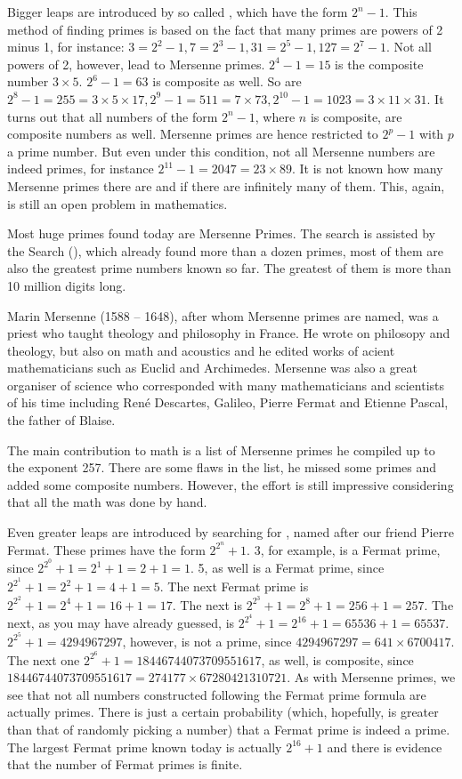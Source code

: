 \documentclass{scrreprt}
\begin{document}
Bigger leaps are introduced by so called ,
which have the form $2^n - 1$.
This method of finding primes is based on the fact
that many primes are powers of 2 minus 1, for instance:
$3 = 2^2 - 1, 7 = 2^3 - 1, 31 = 2^5 - 1, 127 = 2^7 - 1$.
Not all powers of 2, however, lead to Mersenne primes.
$2^4 - 1 =  15$ is the composite number $3 \times 5$.
$2^6 - 1 =  63$ is composite as well. So are
$2^8 - 1 =  255 = 3 \times 5 \times 17, 
 2^9 - 1 =  511 = 7 \times 73,
 2^{10} -1 = 1023 = 3 \times 11 \times 31$.  
It turns out that all numbers of the form $2^n - 1$, 
where $n$ is composite, are composite numbers as well.
Mersenne primes are hence restricted to
$2^p - 1$ with $p$ a prime number.
But even under this condition, not all Mersenne numbers
are indeed primes, for instance
$2^{11} - 1 = 2047 = 23 \times 89$.
It is not known how many Mersenne primes there are
and if there are infinitely many of them.
This, again, is still an open problem in mathematics.

Most huge primes found today are Mersenne Primes.
The search is assisted by the 
 Search (),
which already found more than a dozen primes, most of them
are also the greatest prime numbers known so far.
The greatest of them is more than 10 million digits long.

Marin Mersenne (1588 -- 1648), after whom Mersenne primes are named,
was a priest who taught theology and philosophy in France.
He wrote on philosopy and theology, but also on math and acoustics
and he edited works of acient mathematicians such as Euclid and Archimedes.
Mersenne was also a great organiser of science who corresponded
with many mathematicians and scientists of his time including
René Descartes, Galileo, Pierre Fermat 
and Etienne Pascal, the father of Blaise.

The main contribution to math 
is a list of Mersenne primes he compiled up to the exponent 257.
There are some flaws in the list, he missed some primes and added
some composite numbers. However, the effort is still impressive
considering that all the math was done by hand.

Even greater leaps are introduced by searching for ,
named after our friend Pierre Fermat.
These primes have the form $2^{2^n}+1$.
3, for example, is a Fermat prime, 
since $2^{2^0} + 1 = 2^1 + 1 = 2 + 1 = 1$.
5, as well is a Fermat prime, since
$2^{2^1} + 1 = 2^2 + 1 = 4 + 1 = 5$.
The next Fermat prime is
$2^{2^2} + 1 = 2^4 + 1 = 16 + 1 = 17$.
The next is
$2^{2^3} + 1 = 2^8 + 1 = 256 + 1 = 257$.
The next, as you may have already guessed, is
$2^{2^4} + 1 = 2^{16} + 1 = 65536 + 1 = 65537$.
$2^{2^5} + 1 = 4294967297$, however,
is not a prime, since $4294967297 = 641 \times 6700417$.
The next one $2^{2^6} + 1 = 18446744073709551617$, as well,
is composite, since $18446744073709551617 = 274177 \times 67280421310721$.
As with Mersenne primes, we see that not all numbers
constructed following the Fermat prime formula are actually primes.
There is just a certain probability
(which, hopefully, is greater than that of randomly picking a number)
that a Fermat prime is indeed a prime.
The largest Fermat prime known today is actually $2^{16} + 1$
and there is evidence that the number of Fermat primes is finite.
\end{document}
